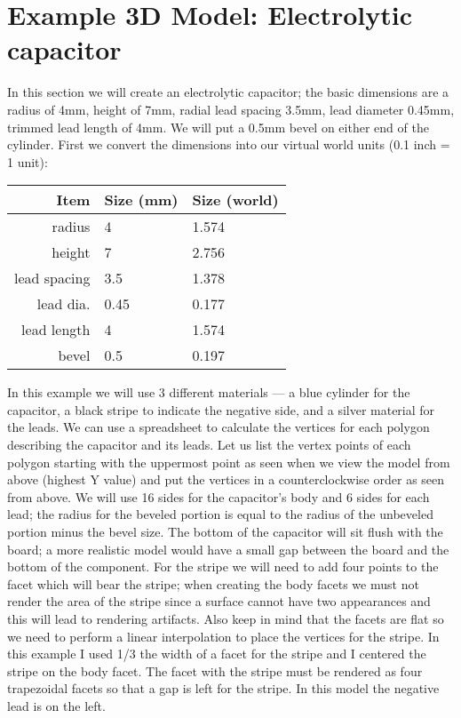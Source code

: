 \documentclass[a4paper]{article}
\begin{document}
\section{Example 3D Model: Electrolytic capacitor}
In this section we will create an electrolytic capacitor; the basic dimensions are a radius of 4mm, height of
7mm, radial lead spacing 3.5mm, lead diameter 0.45mm, trimmed lead length of 4mm. We will put a 0.5mm bevel on
either end of the cylinder. First we convert the dimensions into our virtual world units (0.1 inch = 1 unit):

\begin{tabular}{|r|l|l|}
\hline
Item & Size (mm) & Size (world) \\
\hline
radius & 4 & 1.574\\
height & 7 & 2.756\\
lead spacing & 3.5 & 1.378\\
lead dia. & 0.45 & 0.177\\
lead length & 4 & 1.574\\
bevel & 0.5 & 0.197\\
\hline
\end{tabular}

In this example we will use 3 different materials --- a blue cylinder for the capacitor, a black stripe to
indicate the negative side, and a silver material for the leads. We can use a spreadsheet to calculate the
vertices for each polygon describing the capacitor and its leads. Let us list the vertex points of each
polygon starting with the uppermost point as seen when we view the model from above (highest Y value) and
put the vertices in a counterclockwise order as seen from above.
We will use 16 sides for the capacitor's body and 6 sides for each lead; the radius for the beveled portion is
equal to the radius of the unbeveled portion minus the bevel size. The bottom of the capacitor will sit flush
with the board; a more realistic model would have a small gap between the board and the bottom of the
component. For the stripe we will need to add four points to the facet which will bear the stripe; when creating
the body facets we must not render the area of the stripe since a surface cannot have two appearances and this
will lead to rendering artifacts. Also keep in mind that the facets are flat so we need to perform a linear
interpolation to place the vertices for the stripe.  In this example I used 1/3 the width of a facet for the stripe
and I centered the stripe on the body facet. The facet with the stripe must be rendered as four trapezoidal facets
so that a gap is left for the stripe. In this model the negative lead is on the left.
\end{document}
